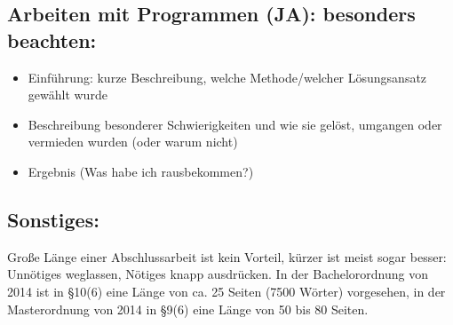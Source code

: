 \documentclass[12pt,a4paper]{article}
\begin{document}
\subsection*{Arbeiten mit Programmen (JA): besonders beachten:}
\begin{itemize}
\item Einführung: kurze Beschreibung, welche Methode/welcher Lösungsansatz gewählt wurde
\item Beschreibung besonderer Schwierigkeiten und wie sie gelöst, umgangen oder vermieden wurden (oder warum nicht)
\item Ergebnis (Was habe ich rausbekommen?)
\end{itemize}
\subsection*{Sonstiges:}
Große Länge einer Abschlussarbeit ist kein Vorteil, kürzer ist meist sogar besser: Unnötiges weglassen, Nötiges knapp ausdrücken. In der Bachelorordnung von 2014 ist in §10(6) eine Länge von ca. 25 Seiten (7500 Wörter) vorgesehen, in der Masterordnung von 2014 in §9(6) eine Länge von 50 bis 80 Seiten.
%
%
%
\end{document}

